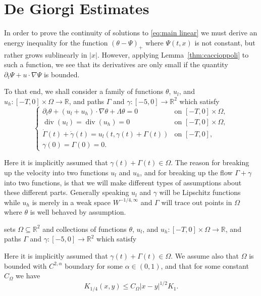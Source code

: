 \documentclass[11pt]{amsart}
\theoremstyle{remark}
\theoremstyle{definition}
\newcommand{\R}{\mathbb{R}}
\newcommand{\paren}[1]{\left( #1 \right)}
\newcommand{\del}{\partial}
\newcommand{\grad}{\nabla}
\renewcommand{\div}{\operatorname{div}}
\newcommand{\ulow}{u_l}
\newcommand{\uhigh}{u_h}
\newcommand{\Comega}{C_\Omega}
\begin{document}

\section{De Giorgi Estimates} \label{sec:de giorgi}

In order to prove the continuity of solutions to \eqref{eq:main linear} we must derive an energy inequality for the function $\paren{\theta - \Psi}_+$ where $\Psi(t,x)$ is not constant, but rather grows sublinearly in $|x|$.  However, applying Lemma~\ref{thm:caccioppoli} to such a function, we see that its derivatives are only small if the quantity $\del_t \Psi + u \cdot \grad\Psi$ is bounded.  

To that end, we shall consider a family of functions $\theta$, $\ulow$, and $\uhigh:[-T,0]\times \Omega \to \R$, and paths $\Gamma$ and $\gamma:[-5,0] \to \R^2$ which satisfy
\begin{equation} \label{eq:main linear brokendown} \begin{cases}
\del_t \theta + (\ulow + \uhigh) \cdot \grad \theta + \Lambda \theta = 0 & \textrm{on } [-T,0] \times \Omega, \\
\div( \ulow) = \div(\uhigh) = 0 & \textrm{on } [-T,0]\times \Omega, \\
\dot{\Gamma}(t) + \dot{\gamma}(t) = \ulow(t, \gamma(t) + \Gamma(t)) & \textrm{on } [-T,0], \\
\gamma(0) = \Gamma(0) = 0.
\end{cases} \end{equation}

Here it is implicitly assumed that $\gamma(t) + \Gamma(t) \in \Omega$.  The reason for breaking up the velocity into two functions $\ulow$ and $\uhigh$, and for breaking up the flow $\Gamma + \gamma$ into two functions, is that we will make different types of assumptions about these different parts.  Generally speaking $\ulow$ and $\gamma$ will be Lipschitz functions while $\uhigh$ is merely in a weak space $W^{-1/4,\infty}$ and $\Gamma$ will trace out points in $\Omega$ where $\theta$ is well behaved by assumption.  

 sets $\Omega \subseteq \R^2$ and collections of functions $\theta$, $\ulow$, and $\uhigh:[-T,0]\times \Omega \to \R$, and paths $\Gamma$ and $\gamma:[-5,0] \to \R^2$ which satisfy


Here it is implicitly assumed that $\gamma(t) + \Gamma(t) \in \Omega$.  We assume also that $\Omega$ is bounded with $C^{2,\alpha}$ boundary for some $\alpha \in (0,1)$, and that for some constant  $\Comega$ we have
\[ K_{1/4}(x,y) \leq \Comega |x-y|^{1/2} K_{1}. \]
\end{document}
